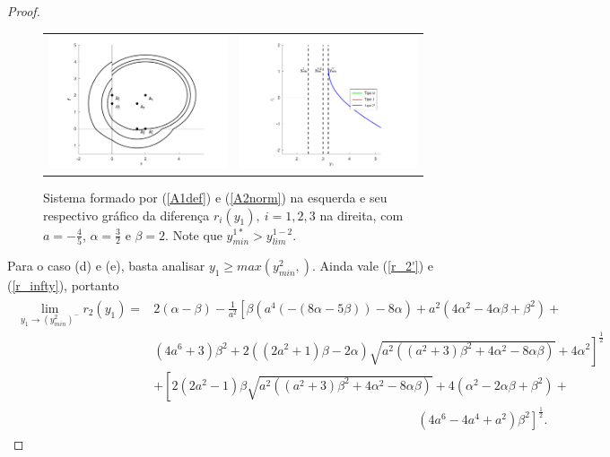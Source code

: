 \begin{proof}
\begin{figure}[H]
\centering
\begin{table}[H]
\centering
\begin{tabular}{cc}
\includegraphics[width=7cm]{images/1.1x1_yeqx_zaft_2.png}
&
\includegraphics[width=7cm]{images/1.1x1_yeqx_zaft_diff_2.png}
\end{tabular}
\end{table}
\caption{\centering\label{prepc2}Sistema formado por (\ref{A1def}) e (\ref{A2norm}) na esquerda e seu respectivo gráfico da diferença $r_i(y_1),\  i=1,2,3$ na direita, com $a=-\frac{4}{5}$, $\alpha=\frac{3}{2}$ e $\beta=2$. Note que $y_{min}^{1*}> y_{lim}^{1-2}$.}
\end{figure}

Para o caso (d) e (e), basta analisar $y_1\geq max(y_{min}^2,)$. Ainda vale (\ref{r_2'}) e (\ref{r_infty}), portanto
\begin{gather}
\begin{aligned}
\label{r_2_2}
\lim_{y_1\rightarrow (y_{min}^2)^-}r_2(y_1)=&2 (\alpha-\beta)
-\frac{1}{a^{2}}\left[\beta\left(a^{4}(-(8 \alpha-5 \beta))-8 \alpha\right)+a^{2}\left(4 \alpha^{2}-4 \alpha \beta+\beta^{2}\right)+\right. \\&
\left.\left(4 a^{6}+3\right) \beta^{2}+2\left(\left(2 a^{2}+1\right) \beta-2 \alpha\right) \sqrt{a^{2}\left(\left(a^{2}+3\right) \beta^{2}+4 \alpha^{2}-8 \alpha \beta\right)}+4 \alpha^{2}\right]^{\frac{1}{2}}\\&
+\left[2\left(2 a^{2}-1\right) \beta \sqrt{a^{2}\left(\left(a^{2}+3\right) \beta^{2}+4 \alpha^{2}-8 \alpha \beta\right)}+4\left(\alpha^{2}-2 \alpha \beta+\beta^{2}\right)+\right.\\&\qquad \qquad \qquad \qquad\quad \qquad\qquad\qquad\qquad\qquad\qquad
\left.\left(4 a^{6}-4 a^{4}+a^{2}\right) \beta^{2}\right]^{\frac{1}{2}}.
\end{aligned}    
\end{gather}

\end{proof}

